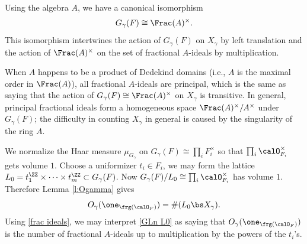 Using the algebra $A$, we have a canonical isomorphism
\begin{equation*}
G_{\gamma}(F)\cong \Frac(A)^{\times}.
\end{equation*}
This isomorphism intertwines the action of $G_{\gamma}(F)$ on $X_{\gamma}$ by left translation and the action of $\Frac(A)^{\times}$ on the set of fractional $A$-ideals by multiplication. 

When $A$ happens to be a product of Dedekind domains (i.e., $A$ is the maximal order in $\Frac(A)$), all fractional $A$-ideals are principal, which is the same as saying that the action of $G_{\gamma}(F)\cong \Frac(A)^{\times}$ on $X_{\gamma}$ is transitive. In general, principal fractional ideals form a homogeneous space $\Frac(A)^{\times}/A^{\times}$ under $G_{\gamma}(F)$; the difficulty in counting $X_{\gamma}$ in general is caused by the singularity of the ring $A$.


We normalize the Haar measure $\mu_{G_{\gamma}}$ on $G_{\gamma}(F)\cong\prod_{i}F^{\times}_{i}$ so that $\prod_{i}\calO^{\times}_{F_{i}}$ gets volume $1$. Choose a uniformizer $t_{i}\in F_{i}$, we may form the lattice $L_{0}=t^{\ZZ}_{1}\times \cdots\times t^{\ZZ}_{m}\subset G_{\gamma}(F)$. Now $G_{\gamma}(F)/L_{0}\cong \prod_{i}\calO_{F_{i}}^{\times}$ has volume $1$. Therefore Lemma \ref{l:Ogamma} gives
\begin{equation}\label{GLn L0}
O_{\gamma}(\one_{\frg(\calO_{F})})=\#(L_{0}\bs X_{\gamma}).
\end{equation}
Using \eqref{frac ideals}, we may interpret \eqref{GLn L0} as saying that $O_{\gamma}(\one_{\frg(\calO_{F})})$ is the number of fractional $A$-ideals up to multiplication by the powers of the $t_{i}$'s. 


